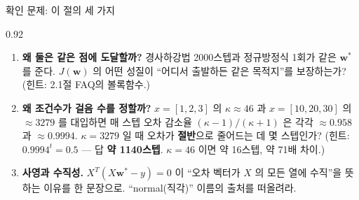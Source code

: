 \begin{frame}{확인 문제: 이 절의 세 가지}
\begin{center}\begin{varwidth}{0.92\textwidth}
  \begin{enumerate}
    \item \textbf{왜 둘은 같은 점에 도달할까?}
      경사하강법 2000스텝과 정규방정식 1회가 같은 $\boldsymbol{w}^{*}$ 를 준다.
      $J(\boldsymbol{w})$ 의 어떤 성질이 ``어디서 출발하든 같은 목적지''를
      보장하는가? (힌트: 2.1절 FAQ의 볼록함수.)
    \item \textbf{왜 조건수가 걸음 수를 정할까?}
      $x=[1,2,3]$ 의 $\kappa \approx 46$ 과 $x=[10,20,30]$ 의
      $\approx 3279$ 를 대입하면 매 스텝 오차 감소율
      $(\kappa-1)/(\kappa+1)$ 은 각각 $\approx 0.958$ 과
      $\approx 0.9994$. $\kappa = 3279$ 일 때 오차가 \textbf{절반}으로
      줄어드는 데 몇 스텝인가? (힌트: $0.9994^t = 0.5$ ---
      답 \textbf{약 1140스텝}. $\kappa = 46$ 이면 약 16스텝,
      약 71배 차이.)
    \item \textbf{사영과 수직성.}
      $X^T(X\boldsymbol{w}^{*} - y) = 0$ 이 ``오차 벡터가 $X$ 의 모든 열에
      수직''을 뜻하는 이유를 한 문장으로. ``normal(직각)'' 이름의
      출처를 떠올려라.
  \end{enumerate}
\end{varwidth}\end{center}
\end{frame}
